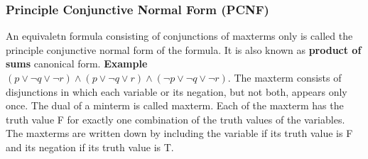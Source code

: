 \subsubsection{Principle Conjunctive Normal Form (PCNF)}
An equivaletn formula consisting of conjunctions of maxterms only is
called the principle conjunctive normal form of the formula. It is also
known as \textbf{product of sums} canonical form. \textbf{Example} $ (p
\lor \neg q \lor \neg r) \land (p \lor \neg q \lor r) \land (\neg p \lor
\neg q \lor \neg r) $. The maxterm consists of disjunctions in which
each variable or its negation, but not both, appears only once. The dual
of a minterm is called maxterm. Each of the maxterm has the truth value
F for exactly one combination of the truth values of the variables. The
maxterms are written down by including the variable if its truth value
is F and its negation if its truth value is T.
